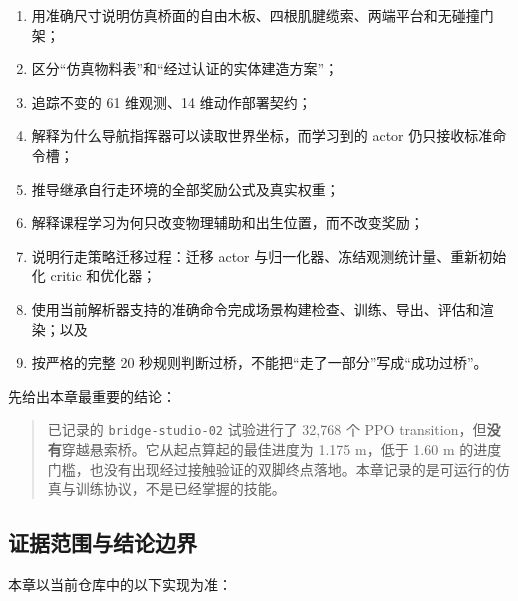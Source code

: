 \documentclass[
  chinese,
  11pt,
  letterpaper,
]{article}
\providecommand{\tightlist}{%
  \setlength{\itemsep}{0pt}\setlength{\parskip}{0pt}}
\begin{document}
\begin{enumerate}
\def\labelenumi{\arabic{enumi}.}
\tightlist
\item
  用准确尺寸说明仿真桥面的自由木板、四根肌腱缆索、两端平台和无碰撞门架；
\item
  区分``仿真物料表''和``经过认证的实体建造方案''；
\item
  追踪不变的 61 维观测、14 维动作部署契约；
\item
  解释为什么导航指挥器可以读取世界坐标，而学习到的 actor
  仍只接收标准命令槽；
\item
  推导继承自行走环境的全部奖励公式及真实权重；
\item
  解释课程学习为何只改变物理辅助和出生位置，而不改变奖励；
\item
  说明行走策略迁移过程：迁移 actor
  与归一化器、冻结观测统计量、重新初始化 critic 和优化器；
\item
  使用当前解析器支持的准确命令完成场景构建检查、训练、导出、评估和渲染；以及
\item
  按严格的完整 20 秒规则判断过桥，不能把``走了一部分''写成``成功过桥''。
\end{enumerate}

先给出本章最重要的结论：

\begin{quote}
已记录的 \texttt{bridge-\allowbreak{}studio-\allowbreak{}02} 试验进行了
32,768 个 PPO
transition，但\textbf{没有}穿越悬索桥。它从起点算起的最佳进度为 1.175
m，低于 1.60 m
的进度门槛，也没有出现经过接触验证的双脚终点落地。本章记录的是可运行的仿真与训练协议，不是已经掌握的技能。
\end{quote}

\subsection{证据范围与结论边界}\label{ux8bc1ux636eux8303ux56f4ux4e0eux7ed3ux8bbaux8fb9ux754c}

本章以当前仓库中的以下实现为准：
\end{document}
